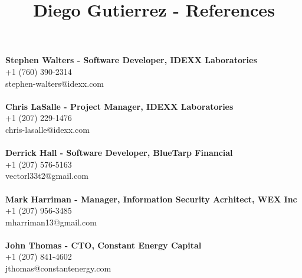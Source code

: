 \documentclass[10pt]{article}
\title{Diego Gutierrez - References}
\date{}
\author{}
\makeatletter
\renewcommand{\maketitle}{\bgroup\setlength{\parindent}{0pt}
	\begin{flushleft}
		\LARGE\textbf{\@title}
		
		\normalsize\@author
	\end{flushleft}\egroup
}
\makeatother
\begin{document}
\maketitle
\thispagestyle{empty} %
\noindent\textbf{Stephen Walters - Software Developer, IDEXX Laboratories}\\
\normalsize +1 (760) 390-2314 \\
stephen-walters@idexx.com \\
\\
\noindent\textbf{Chris LaSalle - Project Manager, IDEXX Laboratories}\\
\normalsize +1 (207) 229-1476\\
chris-lasalle@idexx.com\\
\\
\noindent\textbf{Derrick Hall - Software Developer, BlueTarp Financial}\\
\normalsize +1 (207) 576-5163\\
vectorl33t2@gmail.com\\
\\
\noindent\textbf{Mark Harriman - Manager, Information Security Acrhitect, WEX Inc}\\
\normalsize +1 (207) 956-3485\\
mharriman13@gmail.com\\
\\
\noindent\textbf{John Thomas - CTO, Constant Energy Capital}\\
\normalsize +1 (207) 841-4602\\
jthomas@constantenergy.com\\
\end{document}
